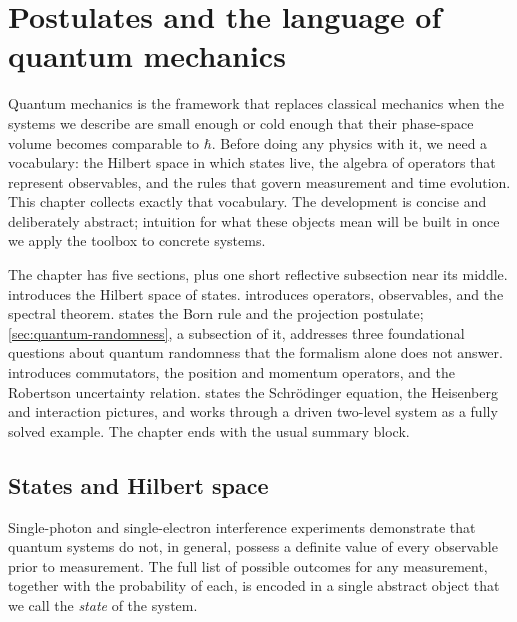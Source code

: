\chapter{Postulates and the language of quantum mechanics}
\label{ch:postulates}


Quantum mechanics is the framework that replaces classical mechanics
when the systems we describe are small enough or cold enough that
their phase-space volume becomes comparable to $\hbar$. Before doing
any physics with it, we need a vocabulary: the Hilbert space in which
states live, the algebra of operators that represent observables, and
the rules that govern measurement and time evolution. This chapter
collects exactly that vocabulary. The development is concise and
deliberately abstract; intuition for what these objects mean will
be built in
 once we apply the
toolbox to concrete systems.

The chapter has five sections, plus one short reflective subsection
near its middle.  introduces the Hilbert space of
states.  introduces operators, observables, and
the spectral theorem.  states the Born rule
and the projection postulate; \cref{sec:quantum-randomness}, a
subsection of it, addresses three foundational questions about
quantum randomness that the formalism alone does not answer.
 introduces commutators, the position and
momentum operators, and the Robertson uncertainty relation.
 states the Schr\"odinger equation, the
Heisenberg and interaction pictures, and works through a driven
two-level system as a fully solved example. The chapter ends with
the usual summary block.

\section{States and Hilbert space}
\label{sec:states}

\begin{phenomenon}
Single-photon and single-electron interference experiments
demonstrate that quantum systems do not, in general, possess a
definite value of every observable prior to measurement. The full
list of possible outcomes for any measurement, together with the
probability of each, is encoded in a single abstract object that we
call the \emph{state} of the system.
\end{phenomenon}

